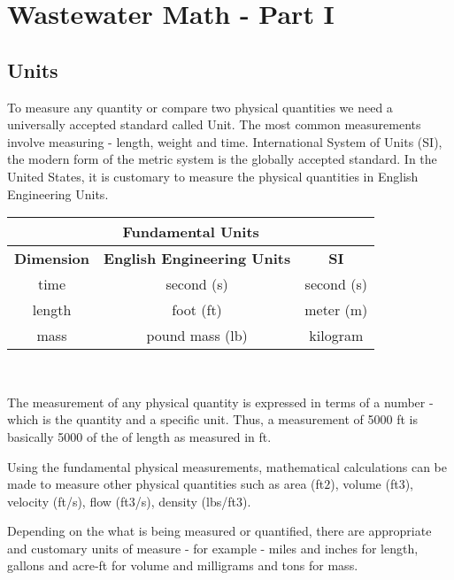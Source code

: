 
\chapter{Wastewater Math - Part I}

\section{Units}

To measure any quantity or compare two physical quantities we need a universally accepted standard called Unit. The most common measurements involve measuring - length, weight and time.   International System of Units (SI), the modern form of the metric system is the globally accepted standard.  In the United States, it is customary to measure the physical quantities in English Engineering Units.\\
\vspace{0.5cm}
\begin{tabular}{c c c }
\hline
\multicolumn{3}{c}{\textbf{Fundamental Units}} \\
\hline
\textbf{Dimension} & \textbf{English Engineering Units} & \textbf{SI}\\
\hline
time & second (s) & second (s) \\
length & foot (ft) & meter (m)\\
mass & pound mass (lb) & kilogram\\
\end{tabular}\\

\vspace{0.5cm}

The measurement of any physical quantity is expressed in terms of a number - which is the quantity and a specific unit.  
Thus, a measurement of 5000 ft is basically 5000 of the of length as measured in ft.

Using the fundamental physical measurements, mathematical calculations can be made to measure other physical quantities such as area (ft$2$), volume (ft$3$), velocity (ft/s), flow (ft$3$/s), density (lbs/ft$3$).

Depending on the what is being measured or quantified, there are appropriate and customary units of measure - for example - miles and inches for length, gallons and acre-ft for volume and milligrams and tons for mass.
